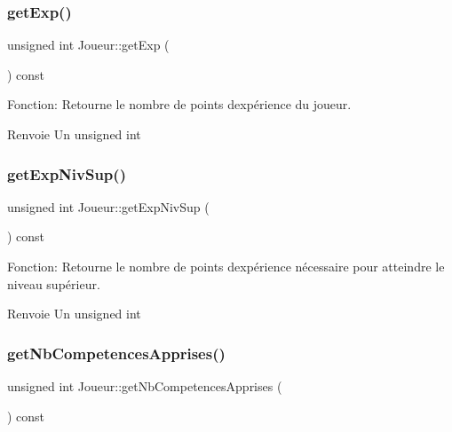 \subsubsection{\texorpdfstring{get\+Exp()}{getExp()}}
{\footnotesize\ttfamily unsigned int Joueur\+::get\+Exp (\begin{DoxyParamCaption}{ }\end{DoxyParamCaption}) const}



Fonction\+: Retourne le nombre de points d\textquotesingle{}expérience du joueur. 

\begin{DoxyReturn}{Renvoie}
Un unsigned int 
\end{DoxyReturn}
\mbox{\label{classJoueur_a6a373cadbec2c4aa63efd813caea81c5}} 
\subsubsection{\texorpdfstring{get\+Exp\+Niv\+Sup()}{getExpNivSup()}}
{\footnotesize\ttfamily unsigned int Joueur\+::get\+Exp\+Niv\+Sup (\begin{DoxyParamCaption}{ }\end{DoxyParamCaption}) const}



Fonction\+: Retourne le nombre de points d\textquotesingle{}expérience nécessaire pour atteindre le niveau supérieur. 

\begin{DoxyReturn}{Renvoie}
Un unsigned int 
\end{DoxyReturn}
\mbox{\label{classJoueur_adc1402a249ac134756268bb3590677c5}} 
\subsubsection{\texorpdfstring{get\+Nb\+Competences\+Apprises()}{getNbCompetencesApprises()}}
{\footnotesize\ttfamily unsigned int Joueur\+::get\+Nb\+Competences\+Apprises (\begin{DoxyParamCaption}{ }\end{DoxyParamCaption}) const}



